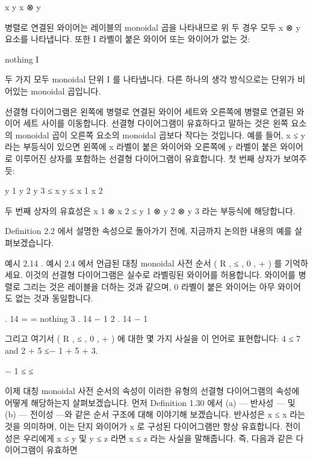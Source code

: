 \documentclass[11pt, a4paper, twoside, openany]{book}
\begin{document}
\par\medskip
x
y
x ⊗ y

\par\medskip
병렬로 연결된 와이어는 레이블의 monoidal 곱을 나타내므로 위 두 경우 모두 x ⊗ y 요소를 나타냅니다. 또한 I 라벨이 붙은 와이어 또는 와이어가 없는 것:

\par\medskip
nothing
I

\par\medskip
두 가지 모두 monoidal 단위 I 를 나타냅니다. 다른 하나의 생각 방식으로는 단위가 비어있는 monoidal 곱입니다.

\par\medskip
선결형 다이어그램은 왼쪽에 병렬로 연결된 와이어 세트와 오른쪽에 병렬로 연결된 와이어 세트 사이를 이동합니다. 선결형 다이어그램이 유효하다고 말하는 것은 왼쪽 요소의 monoidal 곱이 오른쪽 요소의 monoidal 곱보다 작다는 것입니다. 예를 들어, x ≤ y 라는 부등식이 있으면 왼쪽에 x 라벨이 붙은 와이어와 오른쪽에 y 라벨이 붙은 와이어로 이루어진 상자를 포함하는 선결형 다이어그램이 유효합니다. 첫 번째 상자가 보여주듯:

\par\medskip
y 1
y 2
y 3
≤
x
y
≤
x 1
x 2

\par\medskip
두 번째 상자의 유효성은 x 1 ⊗ x 2 ≤ y 1 ⊗ y 2 ⊗ y 3 라는 부등식에 해당합니다.

\par\medskip
Deﬁnition 2.2 에서 설명한 속성으로 돌아가기 전에, 지금까지 논의한 내용의 예를 살펴보겠습니다.

\par\medskip
예시 2.14 . 예시 2.4 에서 언급된 대칭 monoidal 사전 순서 ( R , ≤ , 0 , + ) 를 기억하세요. 이것의 선결형 다이어그램은 실수로 라벨링된 와이어를 허용합니다. 와이어를 병렬로 그리는 것은 레이블을 더하는 것과 같으며, 0 라벨이 붙은 와이어는 아무 와이어도 없는 것과 동일합니다.

\par{} . 14
=
=
nothing
3 . 14
− 1
2 . 14
− 1

\par\medskip
그리고 여기서 ( R , ≤ , 0 , + ) 에 대한 몇 가지 사실을 이 언어로 표현합니다: 4 ≤ 7 and 2 + 5 ≤− 1 + 5 + 3.

\par\medskip
− 1
≤
≤

\par\medskip
이제 대칭 monoidal 사전 순서의 속성이 이러한 유형의 선결형 다이어그램의 속성에 어떻게 해당하는지 살펴보겠습니다. 먼저 Deﬁnition 1.30 에서 (a) — 반사성 — 및 (b) — 전이성 —와 같은 순서 구조에 대해 이야기해 보겠습니다. 반사성은 x ≤ x 라는 것을 의미하며, 이는 단지 와이어가
x
로 구성된 다이어그램만 항상 유효합니다. 전이성은 우리에게 x ≤ y 및 y ≤ z 라면 x ≤ z 라는 사실을 말해줍니다. 즉, 다음과 같은 다이어그램이 유효하면
\end{document}
